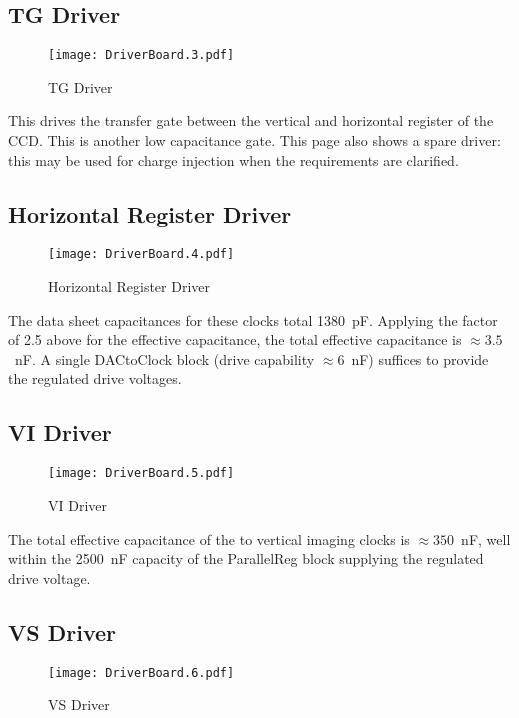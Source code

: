 \documentclass[a4paper,12pt]{article}
\begin{document}
\subsection{TG Driver}
   \begin{figure}
   \begin{center}
   \texttt{[image: DriverBoard.3.pdf]}
   \end{center}
   \caption{TG Driver}
   \end{figure}
   
This drives the transfer gate between the vertical and horizontal register of the CCD. This is another low capacitance gate. This page also shows a spare driver: this may be used for charge injection when the requirements are clarified.
  

\subsection{Horizontal Register Driver}
   \begin{figure}
   \begin{center}
   \texttt{[image: DriverBoard.4.pdf]}
   \end{center}
   \caption{Horizontal Register Driver}
   \end{figure}
   
The data sheet capacitances for these clocks total 1380\ pF. Applying the factor of 2.5 above for the effective capacitance, the total effective capacitance is $\approx 3.5$\ nF. A single DACtoClock block (drive capability $\approx 6$\ nF) suffices to provide the regulated drive voltages.
  

\subsection{VI Driver}
   \begin{figure}
   \begin{center}
   \texttt{[image: DriverBoard.5.pdf]}
   \end{center}
   \caption{VI Driver}
   \end{figure}

The total effective capacitance of the to vertical imaging clocks is $\approx 350$\ nF, well within the 2500\ nF capacity of the ParallelReg block supplying the regulated drive voltage.

\subsection{VS Driver}
   \begin{figure}
   \begin{center}
   \texttt{[image: DriverBoard.6.pdf]}
   \end{center}
   \caption{VS Driver}
   \end{figure}
\end{document}
